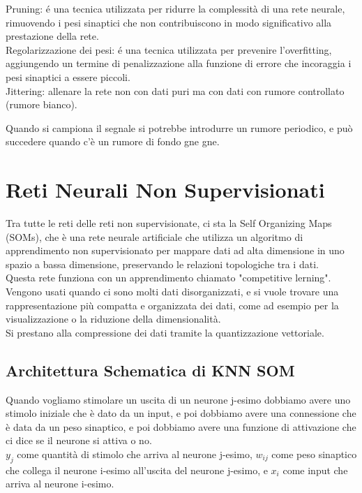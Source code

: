 Pruning: é una tecnica utilizzata per ridurre la complessità di una rete neurale, rimuovendo i pesi sinaptici che non contribuiscono 
in modo significativo alla prestazione della rete.\\

Regolarizzazione dei pesi: é una tecnica utilizzata per prevenire l'overfitting, aggiungendo un termine di penalizzazione alla funzione 
di errore che incoraggia i pesi sinaptici a essere piccoli.\\

Jittering: allenare la rete non con dati puri ma con dati con rumore controllato (rumore bianco).

Quando si campiona il segnale si potrebbe introdurre un rumore periodico, e può succedere quando c'è un rumore di fondo gne gne.

\section{Reti Neurali Non Supervisionati}
Tra tutte le reti delle reti non supervisionate, ci sta la Self Organizing Maps (SOMs), che è una rete neurale artificiale che utilizza un algoritmo di apprendimento non supervisionato per mappare dati ad alta dimensione in uno spazio a bassa dimensione, preservando le relazioni topologiche tra i dati.\\
Questa rete funziona con un apprendimento chiamato "competitive lerning". Vengono usati quando ci sono molti dati disorganizzati, e si vuole trovare una rappresentazione più compatta e organizzata dei dati, come ad esempio per la visualizzazione o la riduzione della dimensionalità.\\

Si prestano alla compressione dei dati tramite la quantizzazione vettoriale.\\

\subsection{Architettura Schematica di KNN SOM}

Quando vogliamo stimolare un uscita di un neurone j-esimo dobbiamo avere uno stimolo iniziale che è dato da un input, e poi dobbiamo avere una connessione che è data da un peso sinaptico, e poi dobbiamo avere una funzione di attivazione che ci dice se il neurone si attiva o no.\\

$y_j$ come quantità di stimolo che arriva al neurone j-esimo, $w_{ij}$ come peso sinaptico che collega il neurone i-esimo all'uscita del neurone j-esimo, e $x_i$ come input che arriva al neurone i-esimo.\\

